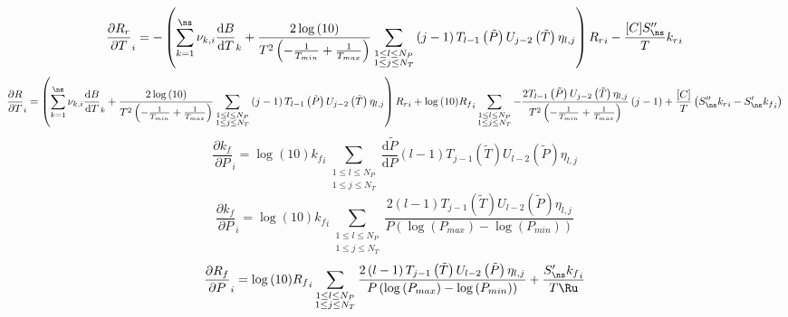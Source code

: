 \documentclass[a4paper,10pt]{article}
\begin{document}
\begin{dmath} \frac{\partial {R_r} }{\partial T }_{i} = - \left(\sum_{k=1}^{\ns} \nu_{k,i} \frac{\text{d} B }{\text{d} T }_{k} + \frac{2 \log{\left (10 \right )}}{T^{2} \left(- \frac{1}{T_{min}} + \frac{1}{T_{max}}\right)} \sum_{\substack{1 \leq l \leq N_{P}\\1 \leq j \leq N_{T}}} \left(j - 1\right) T_{l - 1}\left(\tilde{P}\right) U_{j - 2}\left(\tilde{T}\right) \eta_{l,j}\right) {R_r}_{i} - \frac{[C] S^{\prime\prime}_{\ns}}{T} {k_r}_{i}\end{dmath} 
\begin{dmath} \frac{\partial R }{\partial T }_{i} = \left(\sum_{k=1}^{\ns} \nu_{k,i} \frac{\text{d} B }{\text{d} T }_{k} + \frac{2 \log{\left (10 \right )}}{T^{2} \left(- \frac{1}{T_{min}} + \frac{1}{T_{max}}\right)} \sum_{\substack{1 \leq l \leq N_{P}\\1 \leq j \leq N_{T}}} \left(j - 1\right) T_{l - 1}\left(\tilde{P}\right) U_{j - 2}\left(\tilde{T}\right) \eta_{l,j}\right) {R_r}_{i} + \log{\left (10 \right )} {R_f}_{i} \sum_{\substack{1 \leq l \leq N_{P}\\1 \leq j \leq N_{T}}} - \frac{2 T_{l - 1}\left(\tilde{P}\right) U_{j - 2}\left(\tilde{T}\right) \eta_{l,j}}{T^{2} \left(- \frac{1}{T_{min}} + \frac{1}{T_{max}}\right)} \left(j - 1\right) + \frac{[C]}{T} \left(S^{\prime\prime}_{\ns} {k_r}_{i} - S^{\prime}_{\ns} {k_f}_{i}\right)\end{dmath} 
\begin{dmath} \frac{\partial {k_f} }{\partial P }_{i} = \log{\left (10 \right )} {k_f}_{i} \sum_{\substack{1 \leq l \leq N_{P}\\1 \leq j \leq N_{T}}} \frac{\text{d} \tilde{P} }{\text{d} P } \left(l - 1\right) T_{j - 1}\left(\tilde{T}\right) U_{l - 2}\left(\tilde{P}\right) \eta_{l,j}\end{dmath} 
\begin{dmath} \frac{\partial {k_f} }{\partial P }_{i} = \log{\left (10 \right )} {k_f}_{i} \sum_{\substack{1 \leq l \leq N_{P}\\1 \leq j \leq N_{T}}} \frac{2 \left(l - 1\right) T_{j - 1}\left(\tilde{T}\right) U_{l - 2}\left(\tilde{P}\right) \eta_{l,j}}{P \left(\log{\left (P_{max} \right )} - \log{\left (P_{min} \right )}\right)}\end{dmath} 
\begin{dmath} \frac{\partial {R_f} }{\partial P }_{i} = \log{\left (10 \right )} {R_f}_{i} \sum_{\substack{1 \leq l \leq N_{P}\\1 \leq j \leq N_{T}}} \frac{2 \left(l - 1\right) T_{j - 1}\left(\tilde{T}\right) U_{l - 2}\left(\tilde{P}\right) \eta_{l,j}}{P \left(\log{\left (P_{max} \right )} - \log{\left (P_{min} \right )}\right)} + \frac{S^{\prime}_{\ns} {k_f}_{i}}{T \Ru}\end{dmath} 
\end{document}
